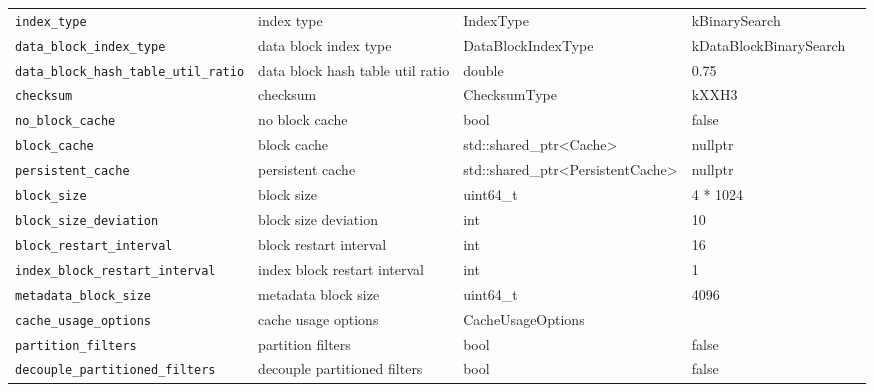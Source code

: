 {{\begin{longtable}{@{}p{3.4cm}p{5.0cm}p{3.6cm}p{2.5cm}p{2.6cm}@{}}
    \texttt{index\_type}
    & index type
    & IndexType
    & kBinarySearch
    & \\

    \texttt{data\_block\_index\_type}
    & data block index type
    & DataBlockIndexType
    & kDataBlockBinarySearch
    & \\

    \texttt{data\_block\_hash\_table\_util\_ratio}
    & data block hash table util ratio
    & double
    & 0.75
    & \\

    \texttt{checksum}
    & checksum
    & ChecksumType
    & kXXH3
    & \\

    \texttt{no\_block\_cache}
    & no block cache
    & bool
    & false
    & \\

    \texttt{block\_cache}
    & block cache
    & std::shared\_ptr\textless{}Cache\textgreater{}
    & nullptr
    & \\

    \texttt{persistent\_cache}
    & persistent cache
    & std::shared\_ptr\textless{}PersistentCache\textgreater{}
    & nullptr
    & \\

    \texttt{block\_size}
    & block size
    & uint64\_t
    & 4 * 1024
    & \\

    \texttt{block\_size\_deviation}
    & block size deviation
    & int
    & 10
    & \\

    \texttt{block\_restart\_interval}
    & block restart interval
    & int
    & 16
    & \\

    \texttt{index\_block\_restart\_interval}
    & index block restart interval
    & int
    & 1
    & \\

    \texttt{metadata\_block\_size}
    & metadata block size
    & uint64\_t
    & 4096
    & \\

    \texttt{cache\_usage\_options}
    & cache usage options
    & CacheUsageOptions
    & 
    & \\

    \texttt{partition\_filters}
    & partition filters
    & bool
    & false
    & \\

    \texttt{decouple\_partitioned\_filters}
    & decouple partitioned filters
    & bool
    & false
    & \\


\end{longtable}}}
